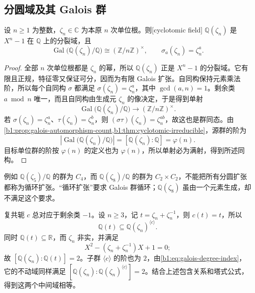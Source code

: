 \subsection{分圆域及其 Galois 群}
\label{b1:subsec:2101:03}

\begin{theorem}\label{b1:thm:cyclotomic-galois-group}
	设 \(n\geq1\) 为整数，\(\zeta_n\in\mathbb C\) 为本原 \(n\) 次单位根。则[cyclotomic field] \(\mathbb Q(\zeta_n)\) 是 \(X^n-1\) 在 \(\mathbb Q\) 上的分裂域，且
	\[
		\operatorname{Gal}\bigl(\mathbb Q(\zeta_n)/\mathbb Q\bigr) \cong(\mathbb Z/n\mathbb Z)^\times, \qquad \sigma_a(\zeta_n)=\zeta_n^a.
	\]
\end{theorem}
\begin{proof}
	全部 \(n\) 次单位根都是 \(\zeta_n\) 的幂，所以 \(\mathbb Q(\zeta_n)\) 正是 \(X^n-1\) 的分裂域。它有限且正规，特征零又保证可分，因而为有限 Galois 扩张。自同构保持元素乘法阶，所以每个自同构 \(\sigma\) 都满足 \(\sigma(\zeta_n)=\zeta_n^a\)，其中 \(\gcd(a,n)=1\)。剩余类 \(a\bmod n\) 唯一，而且自同构由生成元 \(\zeta_n\) 的像决定，于是得到单射
	\[
		\operatorname{Gal}\bigl(\mathbb Q(\zeta_n)/\mathbb Q\bigr) \longrightarrow(\mathbb Z/n\mathbb Z)^\times.
	\]
	若 \(\sigma(\zeta_n)=\zeta_n^a\)、\(\tau(\zeta_n)=\zeta_n^b\)，则 \((\sigma\tau)(\zeta_n)=\zeta_n^{ab}\)，故这也是群同态。由\cref{b1:prop:galois-automorphism-count,b1:thm:cyclotomic-irreducible}，源群的阶为
	\[
		\left|\operatorname{Gal}\bigl(\mathbb Q(\zeta_n)/\mathbb Q\bigr)\right| =[\mathbb Q(\zeta_n):\mathbb Q]=\varphi(n).
	\]
	目标单位群的阶按 \(\varphi(n)\) 的定义也为 \(\varphi(n)\)，所以单射必为满射，得到所述同构。
\end{proof}

例如 \(\mathbb Q(\zeta_5)/\mathbb Q\) 的群为 \(C_4\)，而 \(\mathbb Q(\zeta_8)/\mathbb Q\) 的群为 \(C_2\times C_2\)，不能把所有分圆扩张都称为循环扩张。“循环扩张”要求 Galois 群循环；\(\mathbb Q(\zeta_8)\) 虽由一个元素生成，却不满足这个要求。

\ProseParagraphBreak
复共轭 \(c\) 总对应于剩余类 \(-1\)。设 \(n\geq3\)，记 \(t=\zeta_n+\zeta_n^{-1}\)，则 \(c(t)=t\)，所以
\[
	\mathbb Q(t)\subseteq\mathbb Q(\zeta_n)^{\langle c\rangle}.
\]
同时 \(\mathbb Q(t)\subseteq\mathbb R\)，而 \(\zeta_n\) 非实，并满足
\[
	X^2-(\zeta_n+\zeta_n^{-1})X+1=0;
\]
故 \([\mathbb Q(\zeta_n):\mathbb Q(t)]=2\)。子群 \(\langle c\rangle\) 的阶也为 \(2\)，由\eqref{b1:eq:galois-degree-index}，它的不动域同样满足 \([\mathbb Q(\zeta_n):\mathbb Q(\zeta_n)^{\langle c\rangle}]=2\)。结合上述包含关系和塔式公式，得到这两个中间域相等。

